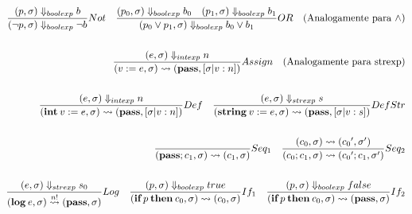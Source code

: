\documentclass{article}
\begin{document}
\begin{align*}
    \frac{(p,\sigma)\Downarrow _{boolexp} b}
         {(\neg p, \sigma)\Downarrow _{boolexp} \neg b} Not \quad 
    \frac{(p_0,\sigma)\Downarrow _{boolexp} b_0 \quad (p_1,\sigma)\Downarrow _{boolexp} b_1}
         {(p_0 \vee p_1, \sigma)\Downarrow _{boolexp} b_0 \vee b_1} OR \quad (\text{Analogamente para }\wedge) \\~\\
    \frac{(e,\sigma)\Downarrow _{intexp} n}
         {(v:=e,\sigma) \mathrel{\leadsto} (\textbf{pass},[\sigma|v:n])} Assign \quad (\text{Analogamente para strexp}) \\~\\
    \frac{(e,\sigma)\Downarrow _{intexp} n}
         {(\textbf{int}\:v:=e,\sigma) \mathrel{\leadsto} (\textbf{pass},[\sigma|v:n])} Def \quad 
    \frac{(e,\sigma)\Downarrow _{strexp} s}
         {(\textbf{string}\:v:=e,\sigma) \mathrel{\leadsto} (\textbf{pass},[\sigma|v:s])} DefStr \\~\\
    \frac{}{(\textbf{pass};c_1,\sigma) \mathrel{\leadsto} (c_1,\sigma)} Seq_1 \quad 
    \frac{(c_0,\sigma) \mathrel{\leadsto} ({c_0}',{\sigma}')}
         {(c_0;c_1,\sigma) \mathrel{\leadsto} ({c_0}';c_1,{\sigma}')} Seq_2 \\~\\
    \frac{(e,\sigma)\Downarrow _{strexp} s_0}
         {(\textbf{log} \: e,\sigma) \overset{n!}{\mathrel{\leadsto}} (\textbf{pass},\sigma)} Log \quad
    \frac{(p,\sigma) \Downarrow _{boolexp} true}
         {(\textbf{if} \: p \: \textbf{then} \: c_0,\sigma) \mathrel{\leadsto} (c_0,\sigma)}If_1 \quad 
    \frac{(p,\sigma)\Downarrow _{boolexp} false}
         {(\textbf{if} \: p \: \textbf{then}\: c_0,\sigma) \mathrel{\leadsto} (\textbf{pass},\sigma)}If_2 \\~\\
\end{align*}
\newpage
\end{document}
